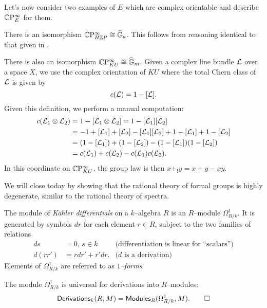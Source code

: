 Let's now consider two examples of $E$ which are complex-orientable and describe $\mathbb{C}\mathrm P^\infty_E$ for them.

\begin{example}
There is an isomorphism $\mathbb{C}\mathrm P^\infty_{H\mathbb Z P} \cong \widehat{\mathbb G}_a$.  This follows from reasoning identical to that given in .
\end{example}

\begin{example}
There is also an isomorphism $\mathbb{C}\mathrm P^\infty_{KU} \cong \widehat{\mathbb G}_m$.  Given a complex line bundle $\mathcal{L}$ over a space $X$, we use the complex orientation of $KU$ where the total Chern class of $\mathcal{L}$ is given by \[c(\mathcal{L}) = 1 - [\mathcal{L}].\]  Given this definition, we perform a manual computation:
\begin{align*}
c(\mathcal{L}_1 \otimes \mathcal{L}_2) & = 1 - [\mathcal{L}_1 \otimes \mathcal{L}_2] = 1 - [\mathcal{L}_1] [\mathcal{L}_2] \\
& = -1 + [\mathcal{L}_1] + [\mathcal{L}_2] - [\mathcal{L}_1] [\mathcal{L}_2] + 1 - [\mathcal{L}_1] + 1 - [\mathcal{L}_2] \\
& = (1 - [\mathcal{L}_1]) + (1 - [\mathcal{L}_2]) - (1 - [\mathcal{L}_1])(1 - [\mathcal{L}_2]) \\
& = c(\mathcal{L}_1) + c(\mathcal{L}_2) - c(\mathcal{L}_1) c(\mathcal{L}_2).
\end{align*}
In this coordinate on $\mathbb{C}\mathrm P^\infty_{KU}$, the group law is then $x +_! y = x + y - xy$.
\end{example}

We will close today by showing that the rational theory of formal groups is highly degenerate, similar to the rational theory of spectra.

\begin{definition}
The module of \textit{K\"ahler differentials} on a $k$--algebra $R$ is an $R$--module $\Omega^1_{R/k}$.  It is generated by symbols $dr$ for each element $r \in R$, subject to the two families of relations
\begin{align*}
ds & = 0, \, s \in k & \text{(differentiation is linear for ``scalars'')} \\
d(rr') & = rdr' + r'dr. & \text{($d$ is a derivation)}
\end{align*}
Elements of $\Omega^1_{R/k}$ are referred to as \textit{$1$--forms}.
\end{definition}

\begin{lemma}
The module $\Omega^1_{R/k}$ is universal for derivations into $R$--modules: \[\mathsf{Derivations}_k(R, M) = \mathsf{Modules}_R(\Omega^1_{R/k}, M). \qed\]
\end{lemma}

